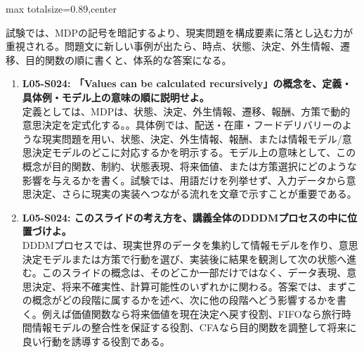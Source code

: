 \begin{minipage}[t]{0.58\textwidth}
\begin{adjustbox}{max totalsize={\textwidth}{0.89\textheight},center}
\begin{minipage}{\textwidth}
試験では、MDPの記号を暗記するより、現実問題を構成要素に落とし込む力が重視される。問題文に新しい事例が出たら、時点、状態、決定、外生情報、遷移、目的関数の順に書くと、体系的な答案になる。\par{}\begin{enumerate}\item \textbf{L05-S024: 「Values can be calculated recursively」の概念を、定義・具体例・モデル上の意味の順に説明せよ。}\\定義としては、MDPは、状態、決定、外生情報、遷移、報酬、方策で動的意思決定を定式化する。。具体例では、配送・在庫・フードデリバリーのような現実問題を用い、状態、決定、外生情報、報酬、または情報モデル/意思決定モデルのどこに対応するかを明示する。モデル上の意味として、この概念が目的関数、制約、状態表現、将来価値、または方策選択にどのような影響を与えるかを書く。試験では、用語だけを列挙せず、入力データから意思決定、さらに現実の実装へつながる流れを文章で示すことが重要である。\item \textbf{L05-S024: このスライドの考え方を、講義全体のDDDMプロセスの中に位置づけよ。}\\DDDMプロセスでは、現実世界のデータを集約して情報モデルを作り、意思決定モデルまたは方策で行動を選び、実装後に結果を観測して次の状態へ進む。このスライドの概念は、そのどこか一部だけではなく、データ表現、意思決定、将来不確実性、計算可能性のいずれかに関わる。答案では、まずこの概念がどの段階に属するかを述べ、次に他の段階へどう影響するかを書く。例えば価値関数なら将来価値を現在決定へ戻す役割、FIFOなら旅行時間情報モデルの整合性を保証する役割、CFAなら目的関数を調整して将来に良い行動を誘導する役割である。\end{enumerate}
\end{minipage}
\end{adjustbox}
\end{minipage}


